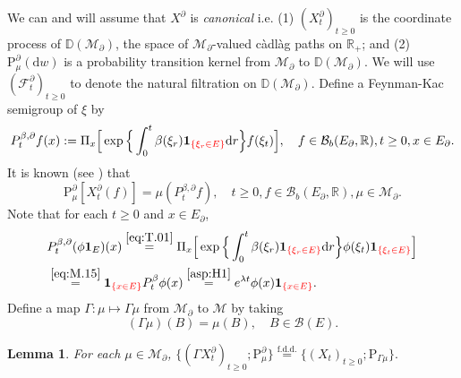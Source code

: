 \documentclass[12pt,a4paper]{amsart}
\numberwithin{equation}{section}
\theoremstyle{plain}
\newtheorem{lem}[thm]{Lemma}
\theoremstyle{definition}
\theoremstyle{remark}
\begin{document}
	We can and will assume that $X^\partial$ is \emph{canonical}  i.e.
	(1) $(X^\partial_t)_{t\geq 0}$ is the coordinate process of $\mathbb D(\mathcal M_\partial)$, the space of $\mathcal M_\partial$-valued c\`adl\`ag paths on $\mathbb R_+$; and
	(2) $\mathrm P^\partial_\mu(\mathrm dw)$ is a probability transition kernel from $\mathcal M_\partial$ to $\mathbb D(\mathcal M_\partial)$.
	We will use $(\mathscr F^\partial_t)_{t\geq 0}$ to denote the natural filtration on $\mathbb D(\mathcal M_\partial)$.
	Define a Feynman-Kac semigroup of $\xi$ by
\begin{align} \label{eq:T.01}
	P_t^{\beta,\partial} f(x)
	:= \Pi_x\Big[\exp\Big\{\int_0^t \beta(\xi_r) \mathbf 1_{{\color{red}\{\xi_r\in E\}}} {\mathrm d}r \Big\} f(\xi_t) \Big],
	\quad f\in \mathcal B_b(E_\partial,\mathbb R), t\geq 0, x\in E_\partial.
\end{align}
	It is known (see \cite[Proposition 2.27]{Li2011Measure-valued}) that
\begin{equation} \label{eq:T.02}
	\mathrm P_\mu^\partial [X^\partial_t(f)] = \mu (P_t^{\beta,\partial} f),
	\quad t\geq 0, f \in \mathcal B_b(E_\partial,\mathbb R), \mu \in \mathcal M_\partial.
\end{equation}
	Note that for each $t\geq 0$ and $x\in E_\partial$,
\begin{align}
	& P_t^{\beta,\partial} (\phi \mathbf 1_E) (x)
	\overset{\eqref{eq:T.01}}= \Pi_x\Big[\exp\Big\{\int_0^t \beta(\xi_r) \mathbf 1_{{\color{red}\{\xi_r\in E\}}} {\mathrm d}r \Big\} \phi(\xi_t) \mathbf 1_{{\color{red}\{\xi_t \in E\}}} \Big]
	\\\label{eq:T.03}&\overset{\eqref{eq:M.15}} = \mathbf 1_{{\color{red}\{x\in E\}}}P_t^\beta \phi (x)
	\overset{\eqref{asp:H1}} = e^{\lambda t} \phi (x)\mathbf 1_{{\color{red}\{x\in E\}}}.
\end{align}
	Define a map $\Gamma: \mu \mapsto \Gamma \mu$ from $\mathcal M_\partial$ to $\mathcal M$ by taking
\[
	(\Gamma \mu)(B) = \mu(B), \quad B\in \mathscr B(E).
\]
	
\begin{lem} \label{thm:T.1}
	For each $\mu \in \mathcal M_\partial$,
$
	\{(\Gamma X^\partial_t)_{t\geq 0}; \mathrm P_\mu^\partial\} \overset{\text{f.d.d.}}= \{(X_t)_{t\geq 0}; \mathrm P_{\Gamma\mu}\}.
$
\end{lem}
\end{document}
